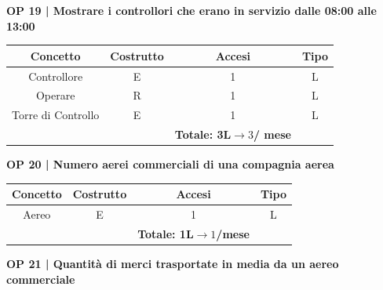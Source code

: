 \textbf{\small OP 19 | Mostrare i controllori che erano in servizio dalle 08:00 alle 13:00}\\

\begin{tabular}{ c c c c}
	\hline
	\rowcolor{airforceblue}
	\textbf{\color{white}Concetto} & \textbf{\color{white}Costrutto} & \textbf{\color{white}Accesi} & \textbf{\color{white}Tipo}\\
	\hline
	\textsf{\small Controllore} & \textsf{\small E} & \textsf{\small 1} &  \textsf{\small L}\\
	\hline
	\textsf{\small Operare} & \textsf{\small R} & \textsf{\small 1} &  \textsf{\small L}\\
	\hline
	\textsf{\small Torre di Controllo} & \textsf{\small E} & \textsf{\small 1} &  \textsf{\small L}\\
	\hline
	\rowcolor{airforceblue}
	\textsf{\small } & \textsf{\small } & \textbf{\color{white}Totale: 3L$\rightarrow 3$/ mese} \textsf{\small } & \textsf{\small }\\
	\hline
\end{tabular}

\vspace{.6cm}


\textbf{\small OP 20 | Numero aerei commerciali di una compagnia aerea}\\

\begin{tabular}{ c c c c}
	\hline
	\rowcolor{airforceblue}
	\textbf{\color{white}Concetto} & \textbf{\color{white}Costrutto} & \textbf{\color{white}Accesi} & \textbf{\color{white}Tipo}\\
	\hline
	\textsf{\small Aereo} & \textsf{\small E} & \textsf{\small 1} &  \textsf{\small L}\\
	\hline
	\rowcolor{airforceblue}
	\textsf{\small } & \textsf{\small } & \textbf{\color{white}Totale: 1L$\rightarrow 1$/mese } \textsf{\small } & \textsf{\small }\\
	\hline
\end{tabular}

\vspace{.6cm}


\textbf{\small OP 21 | Quantità di merci trasportate in media da un aereo commerciale}\\

